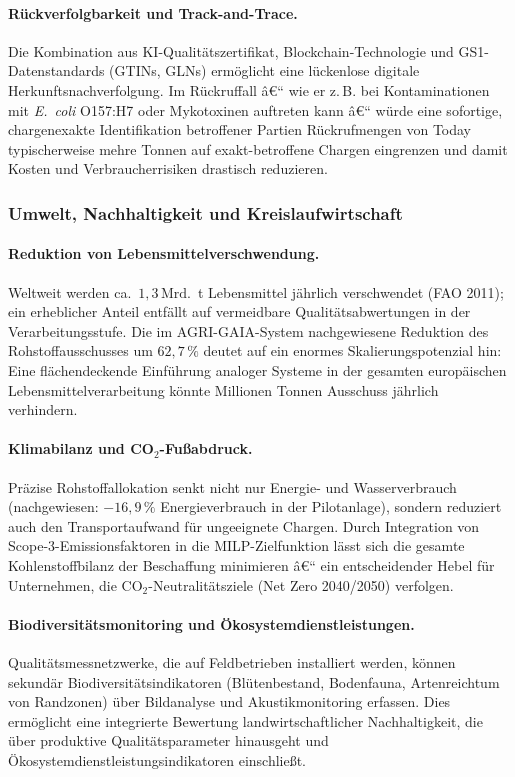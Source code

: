 ﻿\documentclass[12pt,a4paper]{article}
\theoremstyle{plain}
\theoremstyle{definition}
\begin{document}
	\paragraph{Rückverfolgbarkeit und Track-and-Trace.}
	Die Kombination aus KI-Qualitätszertifi\-kat, Blockchain-Technologie
	und GS1-Datenstandards (GTINs, GLNs) ermöglicht eine lückenlose
	digitale Herkunftsnachverfolgung. Im Rückruffall â€“ wie er z.\,B.
	bei Kontaminationen mit \textit{E.\ coli} O157:H7 oder Mykotoxinen
	auftreten kann â€“ würde eine sofortige, chargenexakte Identifikation
	betroffener Partien Rückrufmengen von Today typischerweise mehre Tonnen
	auf exakt-betroffene Chargen eingrenzen und damit Kosten und
	Verbraucherrisiken drastisch reduzieren.

	\subsubsection{Umwelt, Nachhaltigkeit und Kreislaufwirtschaft}

	\paragraph{Reduktion von Lebensmittelverschwendung.}
	Weltweit werden ca.\ $1{,}3\,\text{Mrd.}$~t Lebensmittel jährlich
	verschwendet (FAO 2011); ein erheblicher Anteil entfällt auf
	vermeidbare Qualitätsabwertungen in der Verarbeitungsstufe. Die im
	AGRI-GAIA-System nachgewiesene Reduktion des Rohstoffausschusses um
	$62{,}7\,\%$ deutet auf ein enormes Skalierungspotenzial hin: Eine
	flächendeckende Einführung analoger Systeme in der gesamten
	europäischen Lebensmittelverarbeitung könnte Millionen Tonnen
	Ausschuss jährlich verhindern.

	\paragraph{Klimabilanz und CO$_2$-Fußabdruck.}
	Präzise Rohstoffallokation senkt nicht nur Energie- und
	Wasserverbrauch (nachgewiesen: $-16{,}9\,\%$ Energieverbrauch in der
	Pilotanlage), sondern reduziert auch den Transportaufwand für
	ungeeignete Chargen. Durch Integration von Scope-3-Emissionsfaktoren
	in die MILP-Zielfunktion lässt sich die gesamte Kohlenstoffbilanz
	der Beschaffung minimieren â€“ ein entscheidender Hebel für
	Unternehmen, die CO$_2$-Neutralitätsziele (Net Zero 2040/2050)
	verfolgen.

	\paragraph{Biodiversitätsmonitoring und Ökosystemdienstleistungen.}
	Qualitäts\-messnetzwer\-ke, die auf Feldbetrieben installiert werden,
	können sekundär Biodiversitätsindikatoren (Blütenbestand, Bodenfauna,
	Artenreichtum von Randzonen) über Bildanalyse und Akustikmonitoring
	erfassen. Dies ermöglicht eine integrierte Bewertung landwirtschaftlicher
	Nachhaltigkeit, die über produktive Qualitätsparameter hinausgeht
	und Ökosystemdienstleistungsindikatoren einschließt.
\end{document}
